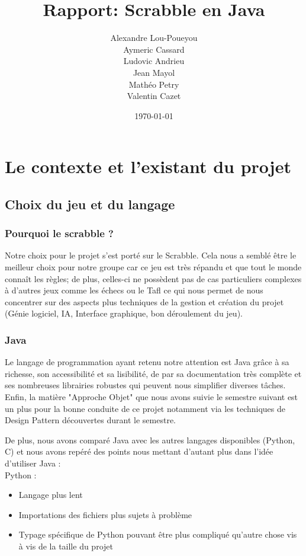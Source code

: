 \documentclass[a4paper,12pt]{article}
\title{Rapport: Scrabble en Java}
\author{Alexandre Lou-Poueyou \\
Aymeric Cassard\\
Ludovic Andrieu\\
Jean Mayol\\
Mathéo Petry\\ 
Valentin Cazet}
\date{\today}
\begin{document}
\maketitle


\tableofcontents


\section{Le contexte et l'existant du projet}

\subsection{Choix du jeu et du langage}

\subsubsection{Pourquoi le scrabble ?}

Notre choix pour le projet s'est porté sur le Scrabble. Cela nous a semblé être le meilleur choix pour notre groupe car ce jeu est très répandu et que tout le monde connaît les règles; de plus, celles-ci ne possèdent pas de cas particuliers complexes à d'autres jeux comme les échecs ou le Tafl ce qui nous permet de nous concentrer sur des aspects plus techniques de la gestion et création du projet (Génie logiciel, IA, Interface graphique, bon déroulement du jeu).

\subsubsection{Java}

Le langage de programmation ayant retenu notre attention est Java grâce à sa richesse, son accessibilité et sa lisibilité, de par sa documentation très complète et ses nombreuses librairies robustes qui peuvent nous simplifier diverses tâches. Enfin, la matière "Approche Objet" que nous avons suivie le semestre suivant est un plus pour la bonne conduite de ce projet notamment via les techniques de Design Pattern découvertes durant le semestre.

De plus, nous avons comparé Java avec les autres langages disponibles (Python, C) et nous avons repéré des points nous mettant d'autant plus dans l'idée d'utiliser Java : 
\\ \newline
Python : 
\begin{itemize}[]
    \item Langage plus lent
    \item Importations des fichiers plus sujets à problème
    \item Typage spécifique de Python pouvant être plus compliqué qu'autre chose vis à vis de la taille du projet
\end{itemize}
\end{document}
